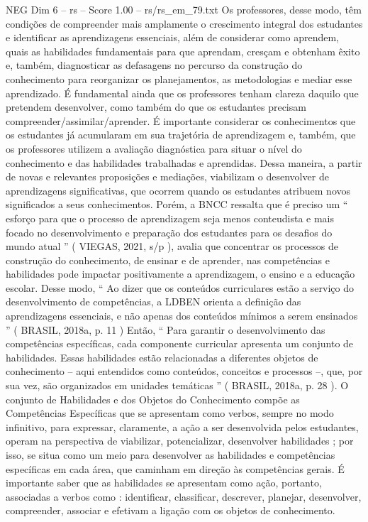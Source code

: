 \begin{textsample}{NEG Dim 6 – rs – Score 1.00 – rs/rs\_em\_79.txt}
Os professores, desse modo, têm condições de compreender mais amplamente o crescimento integral dos estudantes e identificar as aprendizagens essenciais, além de considerar como aprendem, quais as habilidades fundamentais para que aprendam, cresçam e obtenham êxito e, também, diagnosticar as defasagens no percurso da construção do conhecimento para reorganizar os planejamentos, as metodologias e mediar esse aprendizado.
É fundamental ainda que os professores tenham clareza daquilo que pretendem desenvolver, como também do que os estudantes precisam compreender/assimilar/aprender.
É importante considerar os conhecimentos que os estudantes já acumularam em sua trajetória de aprendizagem e, também, que os professores utilizem a avaliação diagnóstica para situar o nível do conhecimento e das habilidades trabalhadas e aprendidas.
Dessa maneira, a partir de novas e relevantes proposições e mediações, viabilizam o desenvolver de aprendizagens significativas, que ocorrem quando os estudantes atribuem novos significados a seus conhecimentos.
Porém, a BNCC ressalta que é preciso um “ esforço para que o processo de aprendizagem seja menos conteudista e mais focado no desenvolvimento e preparação dos estudantes para os desafios do mundo atual ” ( VIEGAS, 2021, s/p ), avalia que concentrar os processos de construção do conhecimento, de ensinar e de aprender, nas competências e habilidades pode impactar positivamente a aprendizagem, o ensino e a educação escolar.
Desse modo, “ Ao dizer que os conteúdos curriculares estão a serviço do desenvolvimento de competências, a LDBEN orienta a definição das aprendizagens essenciais, e não apenas dos conteúdos mínimos a serem ensinados ” ( BRASIL, 2018a, p. 11 ) Então, “ Para garantir o desenvolvimento das competências específicas, cada componente curricular apresenta um conjunto de habilidades.
Essas habilidades estão relacionadas a diferentes objetos de conhecimento – aqui entendidos como conteúdos, conceitos e processos –, que, por sua vez, são organizados em unidades temáticas ” ( BRASIL, 2018a, p. 28 ).
O conjunto de Habilidades e dos Objetos do Conhecimento compõe as Competências Específicas que se apresentam como verbos, sempre no modo infinitivo, para expressar, claramente, a ação a ser desenvolvida pelos estudantes, operam na perspectiva de viabilizar, potencializar, desenvolver habilidades ; por isso, se situa como um meio para desenvolver as habilidades e competências específicas em cada área, que caminham em direção às competências gerais.
É importante saber que as habilidades se apresentam como ação, portanto, associadas a verbos como : identificar, classificar, descrever, planejar, desenvolver, compreender, associar e efetivam a ligação com os objetos de conhecimento.

\end{textsample}
